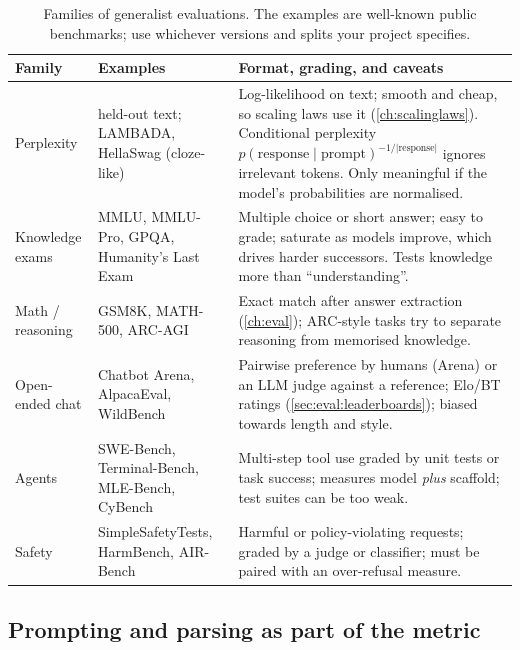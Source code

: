 \begin{table}[t]
\centering\small
\begin{tabularx}{\linewidth}{@{}l>{\raggedright\arraybackslash}p{3.1cm}X@{}}
\toprule
\textbf{Family} & \textbf{Examples} & \textbf{Format, grading, and caveats}\\
\midrule
Perplexity & held-out text; LAMBADA, HellaSwag (cloze-like) & Log-likelihood on text; smooth and cheap, so scaling laws use it (\cref{ch:scalinglaws}). Conditional perplexity $p(\text{response}\mid\text{prompt})^{-1/|\text{response}|}$ ignores irrelevant tokens. Only meaningful if the model's probabilities are normalised. \\
Knowledge exams & MMLU, MMLU-Pro, GPQA, Humanity's Last Exam & Multiple choice or short answer; easy to grade; saturate as models improve, which drives harder successors. Tests knowledge more than ``understanding''.\\
Math / reasoning & GSM8K, MATH-500, ARC-AGI & Exact match after answer extraction (\cref{ch:eval}); ARC-style tasks try to separate reasoning from memorised knowledge.\\
Open-ended chat & Chatbot Arena, AlpacaEval, WildBench & Pairwise preference by humans (Arena) or an LLM judge against a reference; Elo/BT ratings (\cref{sec:eval:leaderboards}); biased towards length and style.\\
Agents & SWE-Bench, Terminal-Bench, MLE-Bench, CyBench & Multi-step tool use graded by unit tests or task success; measures model \emph{plus} scaffold; test suites can be too weak.\\
Safety & SimpleSafetyTests, HarmBench, AIR-Bench & Harmful or policy-violating requests; graded by a judge or classifier; must be paired with an over-refusal measure.\\
\bottomrule
\end{tabularx}
\caption{Families of generalist evaluations. The examples are well-known public benchmarks;
use whichever versions and splits your project specifies.}
\label{tab:align:bench}
\end{table}

\subsection{Prompting and parsing as part of the metric}

